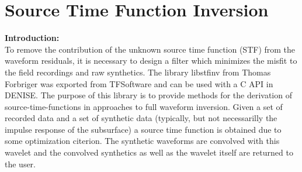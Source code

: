 \chapter{\label{cha:STF-Inversion}Source Time Function Inversion}
\textbf{Introduction:}\\
To remove the contribution of the unknown source time function (STF) from the waveform residuals, it is necessary to design a filter which minimizes the misfit to the field recordings and raw synthetics. The library libstfinv from Thomas Forbriger was exported from TFSoftware and can be used with a C API in DENISE. The purpose of this library is to provide methods for the derivation of source-time-functions in approaches to full waveform inversion. Given a set of recorded data and a set of synthetic data (typically, but not necessarilly the impulse response of the subsurface) a source time function is obtained due to some optimization citerion. The synthetic waveforms are convolved with this wavelet and the convolved synthetics as well as the wavelet itself are returned to the user.

